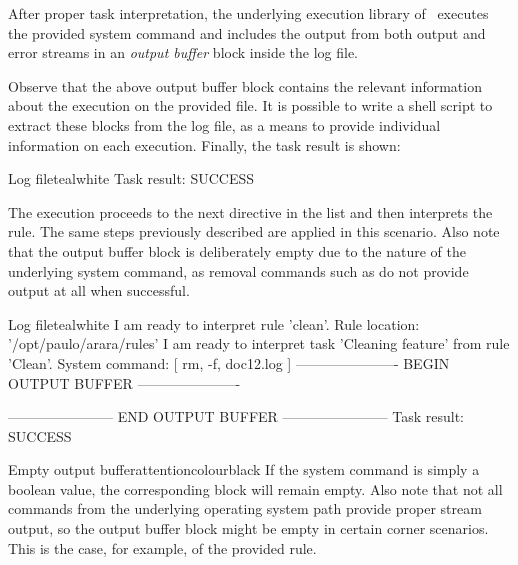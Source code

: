 After proper task interpretation, the underlying execution library of \arara\ executes the provided system command and includes the output from both output and error streams in an \emph{output buffer} block inside the log file.


Observe that the above output buffer block contains the relevant information about the  execution on the provided file. It is possible to write a shell script to extract these blocks from the log file, as a means to provide individual information on each execution. Finally, the task result is shown:

\begin{codebox}{Log file}{teal}{\icnote}{white}
Task result: SUCCESS
\end{codebox}

The execution proceeds to the next directive in the list and then interprets the  rule. The same steps previously described are applied in this scenario. Also note that the output buffer block is deliberately empty due to the nature of the underlying system command, as removal commands such as  do not provide output at all when successful.

\begin{codebox}{Log file}{teal}{\icnote}{white}
I am ready to interpret rule 'clean'.
Rule location: '/opt/paulo/arara/rules'
I am ready to interpret task 'Cleaning feature' from rule 'Clean'.
System command: [ rm, -f, doc12.log ]
---------------------- BEGIN OUTPUT BUFFER ----------------------

----------------------- END OUTPUT BUFFER -----------------------
Task result: SUCCESS
\end{codebox}

\begin{messagebox}{Empty output buffer}{attentioncolour}{\icattention}{black}
If the system command is simply a boolean value, the corresponding block will remain empty. Also note that not all commands from the underlying operating system path provide proper stream output, so the output buffer block might be empty in certain corner scenarios. This is the case, for example, of the provided  rule.
\end{messagebox}

